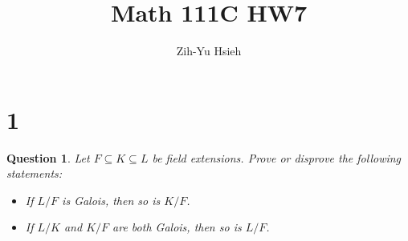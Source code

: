 \documentclass{article}
\title{Math 111C HW7}
\author{Zih-Yu Hsieh}
\newtheorem{question}{Question}
\begin{document}
\maketitle

\section*{1}
\begin{myBox}[]{}
    \begin{question}
        Let $F\subseteq K\subseteq L$ be field extensions. Prove or disprove the following statements:
        \begin{itemize}
            \item[(i)] If $L/F$ is Galois, then so is $K/F$.
            \item[(ii)] If $L/K$ and $K/F$ are both Galois, then so is $L/F$. 
        \end{itemize}
    \end{question}
\end{myBox}
\end{document}
